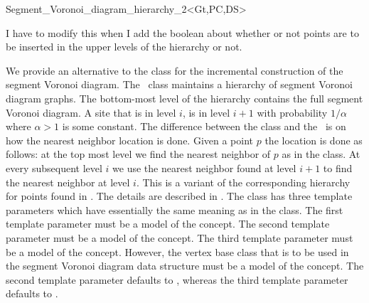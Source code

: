 


\begin{ccRefClass}{Segment_Voronoi_diagram_hierarchy_2<Gt,PC,DS>}

{\sc I have to modify this when I add the boolean about whether or not
  points are to be inserted in the upper levels of the hierarchy or
  not.}

\ccDefinition

We provide an alternative to the class
 for the incremental
construction of the segment Voronoi diagram. The \ccRefName\ class
maintains a hierarchy of segment Voronoi diagram graphs. The
bottom-most level of the hierarchy contains the full segment Voronoi
diagram. A site that is in level $i$, is in level $i+1$ with
probability $1/\alpha$ where $\alpha > 1$ is some constant. The
difference between the  class
and the \ccRefName\ is on how the nearest neighbor location is
done. Given a point $p$ the location is done as follows: at the top
most level we find the nearest neighbor of $p$ as in the
 class. At every subsequent
level $i$ we use the nearest neighbor found at level $i+1$ to find the
nearest neighbor at level $i$. This is a variant of the corresponding
hierarchy for points found in \cite{d-iirdt-98}. The details are
described in \cite{k-peasv-04}.
%
The class has three template parameters which have essentially the same
meaning as in the  class. The
first template parameter must be a model of the
 concept.
The second template parameter must be a model of the
 concept. The third template parameter must be a
model of the 
concept. However, the vertex base class that is to be used in the
segment Voronoi diagram data structure must
be a model of the 
concept. The second template parameter defaults to
, whereas the third
template parameter defaults to
. 


\end{ccRefClass}
